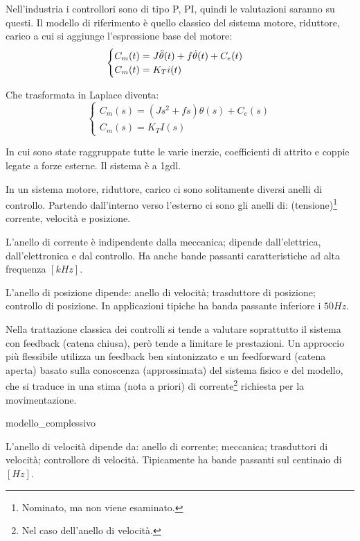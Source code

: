 Nell'industria i controllori sono di tipo P, PI, quindi le valutazioni saranno su questi.
Il modello di riferimento è quello classico del sistema motore, riduttore, carico a cui si aggiunge l'espressione base del motore:
\[
\begin{cases}
    C_m(t) = J \Ddot{\theta}(t) + f \dot{\theta}(t) + C_e (t) \\
    C_m(t) = K_T i(t)
\end{cases}
\]

Che trasformata in Laplace diventa:
\[
\begin{cases}
    C_m(s)=(Js^2+fs)\theta(s) + C_e (s) \\
    C_m(s)=K_T I(s)
\end{cases}
\]

In cui sono state raggruppate tutte le varie inerzie, coefficienti di attrito e coppie legate a forze esterne.
Il sistema è a 1gdl.

In un sistema motore, riduttore, carico ci sono solitamente diversi anelli di controllo. Partendo dall'interno verso l'esterno ci sono gli anelli di: (tensione)\footnote{Nominato, ma non viene esaminato.} corrente, velocità e posizione.

L'anello di corrente è indipendente dalla meccanica; dipende dall'elettrica, dall'elettronica e dal controllo. Ha anche bande passanti caratteristiche ad alta frequenza \([kHz]\).

L'anello di posizione dipende: anello di velocità; trasduttore di posizione; controllo di posizione. In applicazioni tipiche ha banda passante inferiore i \(50 Hz\). 

Nella trattazione classica dei controlli si tende a valutare soprattutto il sistema con feedback (catena chiusa), però tende a limitare le prestazioni. Un approccio più flessibile utilizza un feedback ben sintonizzato e un feedforward (catena aperta) basato sulla conoscenza (approssimata) del sistema fisico e del modello, che si traduce in una stima (nota a priori) di corrente\footnote{Nel caso dell'anello di velocità.} richiesta per la movimentazione.

{modello_complessivo}

L'anello di velocità dipende da: anello di corrente; meccanica; trasduttori di velocità; controllore di velocità.
Tipicamente ha bande passanti sul centinaio di \([Hz]\).

